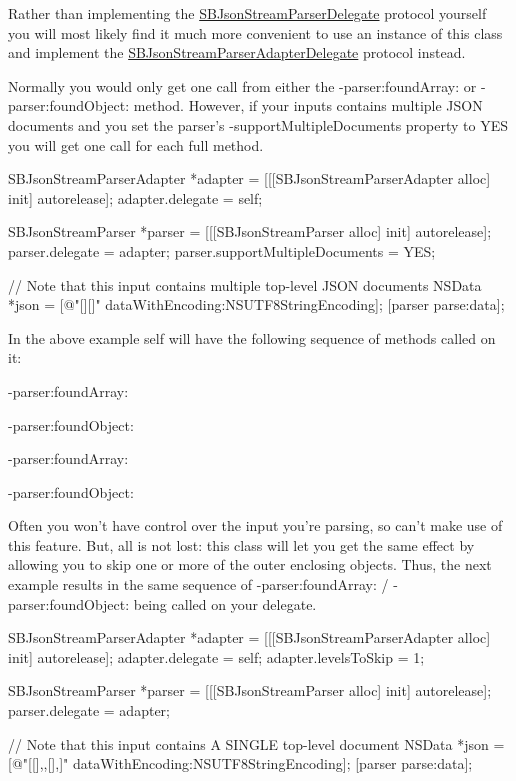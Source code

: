 \-Rather than implementing the \hyperlink{protocol_s_b_json_stream_parser_delegate-p}{\-S\-B\-Json\-Stream\-Parser\-Delegate} protocol yourself you will most likely find it much more convenient to use an instance of this class and implement the \hyperlink{protocol_s_b_json_stream_parser_adapter_delegate-p}{\-S\-B\-Json\-Stream\-Parser\-Adapter\-Delegate} protocol instead.

\-Normally you would only get one call from either the -\/parser\-:found\-Array\-: or -\/parser\-:found\-Object\-: method. \-However, if your inputs contains multiple \-J\-S\-O\-N documents and you set the parser's -\/support\-Multiple\-Documents property to \-Y\-E\-S you will get one call for each full method.


\begin{DoxyCode}
 SBJsonStreamParserAdapter *adapter = [[[SBJsonStreamParserAdapter alloc] init]
       autorelease];
 adapter.delegate = self;
 
 SBJsonStreamParser *parser = [[[SBJsonStreamParser alloc] init] autorelease];
 parser.delegate = adapter;
 parser.supportMultipleDocuments = YES;

 // Note that this input contains multiple top-level JSON documents
 NSData *json = [@"[]{}[]{}" dataWithEncoding:NSUTF8StringEncoding]; 
 [parser parse:data];
\end{DoxyCode}


\-In the above example {\ttfamily self} will have the following sequence of methods called on it\-:

\begin{DoxyItemize}
\item -\/parser\-:found\-Array\-: \item -\/parser\-:found\-Object\-: \item -\/parser\-:found\-Array\-: \item -\/parser\-:found\-Object\-:\end{DoxyItemize}
\-Often you won't have control over the input you're parsing, so can't make use of this feature. \-But, all is not lost\-: this class will let you get the same effect by allowing you to skip one or more of the outer enclosing objects. \-Thus, the next example results in the same sequence of -\/parser\-:found\-Array\-: / -\/parser\-:found\-Object\-: being called on your delegate.


\begin{DoxyCode}
 SBJsonStreamParserAdapter *adapter = [[[SBJsonStreamParserAdapter alloc] init]
       autorelease];
 adapter.delegate = self;
 adapter.levelsToSkip = 1;
 
 SBJsonStreamParser *parser = [[[SBJsonStreamParser alloc] init] autorelease];
 parser.delegate = adapter;
 
 // Note that this input contains A SINGLE top-level document
 NSData *json = [@"[[],{},[],{}]" dataWithEncoding:NSUTF8StringEncoding]; 
 [parser parse:data];
\end{DoxyCode}
 

